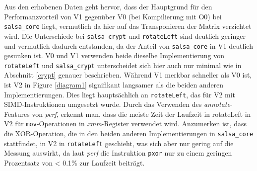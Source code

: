 \documentclass[course=erap]{aspdoc}
\begin{document}
\begin{center}
\label{diagram2}
\end{center}
Aus den erhobenen Daten geht hervor, dass der Hauptgrund für den Performanzvorteil von 
V1 gegenüber V0 (bei Kompilierung mit O0) bei \texttt{salsa\_core} liegt, vermutlich da hier auf das 
Transponieren der Matrix verzichtet wird.
Die Unterschiede bei \texttt{salsa\_crypt} und \texttt{rotateLeft} sind deutlich geringer und vermutlich dadurch
entstanden, da der Anteil von \texttt{salsa\_core} in V1 deutlich gesunken ist. V0 und V1 verwenden beide
dieselbe Implementierung von \texttt{rotateLeft} und \texttt{salsa\_crypt} unterscheidet sich hier auch nur minimal
wie in Abschnitt \ref{crypt} genauer beschrieben. Während V1 merkbar schneller als V0 ist, ist V2 in Figure 
\ref{diagram1} signifikant langsamer als die beiden anderen Implementierungen. Dies liegt hauptsächlich an \texttt{rotateLeft}, 
das für V2 mit SIMD-Instruktionen umgesetzt wurde. Durch das Verwenden des \emph{annotate}-Features von 
\emph{perf}, erkennt man, dass die meiste Zeit der Laufzeit in rotateLeft in V2 für \texttt{mov}-Operationen in 
\emph{xmm}-Register verwendet wird. Anzumerken ist, dass die XOR-Operation, die in den beiden anderen Implementierungen
in \texttt{salsa\_core} stattfindet, in V2 in \texttt{rotateLeft} geschieht, was sich aber nur gering auf die Messung auswirkt,
da laut \emph{perf} die Instruktion \texttt{pxor} nur zu einem geringen Prozentsatz von < 0.1\% zur Laufzeit beiträgt.
\end{document}
